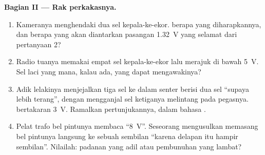 \begin{problem}
\medskip\noindent\textbf{Bagian II --- Rak perkakasnya.}
\begin{enumerate}[resume]
  \item Kameranya menghendaki dua sel kepala-ke-ekor.  berapa
        yang diharapkannya, dan berapa yang akan diantarkan pasangan
        \qty{1.32}{V} yang selamat dari pertanyaan 2?
  \item Radio tuanya memakai empat sel kepala-ke-ekor lalu merajuk di
        bawah \qty{5}{V}. Sel laci yang mana, kalau ada, yang dapat
        mengawakinya?
  \item Adik lelakinya menjejalkan tiga sel ke dalam senter berisi dua
        sel ``supaya lebih terang'', dengan mengganjal sel ketiganya
        melintang pada pegasnya.  bertakaran \qty{3}{V}.
        Ramalkan pertunjukannya, dalam bahasa .
  \item Pelat trafo bel pintunya membaca ``\qty{8}{V}''. Seseorang
        mengusulkan memasang bel pintunya langsung ke sebuah 
        sembilan  ``karena delapan itu hampir sembilan''.
        Nilailah: padanan yang adil atau pembunuhan yang lambat?
\end{enumerate}


\end{problem}
